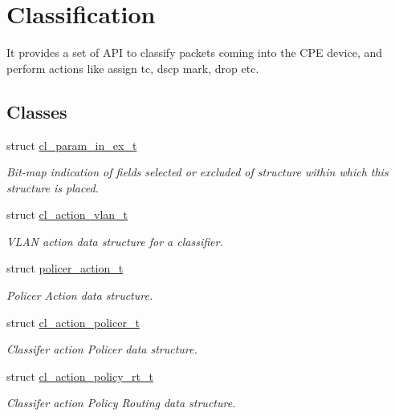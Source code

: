 \hypertarget{group__FAPI__QOS__CLASS}{\section{Classification}
\label{group__FAPI__QOS__CLASS}
}


It provides a set of A\-P\-I to classify packets coming into the C\-P\-E device, and perform actions like assign tc, dscp mark, drop etc.  


\subsection*{Classes}
\begin{DoxyCompactItemize}
\item 
struct \hyperlink{structcl__param__in__ex__t}{cl\-\_\-param\-\_\-in\-\_\-ex\-\_\-t}
\begin{DoxyCompactList}\small\item\em Bit-\/map indication of fields selected or excluded of structure within which this structure is placed. \end{DoxyCompactList}\item 
struct \hyperlink{structcl__action__vlan__t}{cl\-\_\-action\-\_\-vlan\-\_\-t}
\begin{DoxyCompactList}\small\item\em V\-L\-A\-N action data structure for a classifier. \end{DoxyCompactList}\item 
struct \hyperlink{structpolicer__action__t}{policer\-\_\-action\-\_\-t}
\begin{DoxyCompactList}\small\item\em Policer Action data structure. \end{DoxyCompactList}\item 
struct \hyperlink{structcl__action__policer__t}{cl\-\_\-action\-\_\-policer\-\_\-t}
\begin{DoxyCompactList}\small\item\em Classifer action Policer data structure. \end{DoxyCompactList}\item 
struct \hyperlink{structcl__action__policy__rt__t}{cl\-\_\-action\-\_\-policy\-\_\-rt\-\_\-t}
\begin{DoxyCompactList}\small\item\em Classifer action Policy Routing data structure. \end{DoxyCompactList}\item 

\end{DoxyCompactItemize}
